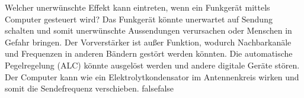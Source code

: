     {Welcher unerwünschte Effekt kann eintreten, wenn ein Funkgerät mittels Computer gesteuert wird?}
    {Das Funkgerät könnte unerwartet auf Sendung schalten und somit unerwünschte Aussendungen verursachen oder Menschen in Gefahr bringen.}
    {Der Vorverstärker ist außer Funktion, wodurch Nachbarkanäle und Frequenzen in anderen Bändern gestört werden könnten.}
    {Die automatische Pegelregelung (ALC) könnte ausgelöst werden und andere digitale Geräte stören.}
    {Der Computer kann wie ein Elektrolytkondensator im Antennenkreis wirken und somit die Sendefrequenz verschieben.}
    {false}{false}